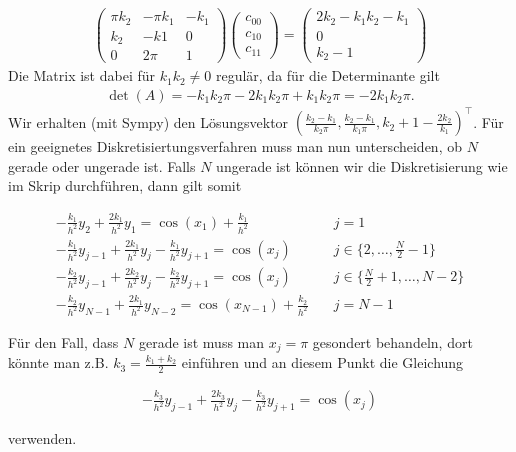 \begin{solution}
\begin{itemize}
    \begin{align*}
      \left( \begin{array}{ccc}
        \pi k_2 & -\pi k_1 & - k_1 \\
        k_2 & -k1 & 0 \\
        0 & 2\pi & 1
      \end{array}
      \right) \left(
      \begin{array}{c}
        c_{00} \\
        c_{10} \\
        c_{11}
      \end{array}
      \right)
      =
      \left(
      \begin{array}{c}
      2k_2 - k_1 k_2 - k_1 \\
      0 \\
      k_2 - 1
      \end{array}
      \right)
    \end{align*}
    Die Matrix ist dabei für $k_1k_2 \neq 0$ regulär, da für die Determinante gilt
    \begin{align*}
      \det(A) = -k_1k_2\pi -2k_1k_2\pi + k_1k_2\pi = -2k_1k_2\pi.
    \end{align*}
    Wir erhalten (mit Sympy) den Lösungsvektor
    $(\frac{k_2 - k_1}{k_2\pi}, \frac{k_2 - k_1}{k_1\pi}, k_2 + 1 - \frac{2k_2}{k_1})^{\top}$.
    Für ein geeignetes Diskretisiertungsverfahren muss man nun unterscheiden, ob
    $N$ gerade oder ungerade ist. Falls $N$ ungerade ist können wir die Diskretisierung
    wie im Skrip durchführen, dann gilt somit

    \begin{align*}
      -\frac{k_1}{h^2} y_2 + \frac{2k_1}{h^2} y_1
      =
      \cos(x_1) + \frac{k_1}{h^2}
      \quad
      & j = 1 \\
      -\frac{k_1}{h^2} y_{j-1} + \frac{2k_1}{h^2} y_j - \frac{k_1}{h^2}y_{j+1}
      =
      \cos(x_j)
      \quad
      &j \in \{2, \dots, \frac{N}{2}-1\} \\
      -\frac{k_2}{h^2} y_{j-1} + \frac{2k_2}{h^2} y_j - \frac{k_2}{h^2}y_{j+1}
      =
      \cos(x_j)
      \quad
      &j \in \{\frac{N}{2}+1, \dots , N-2\} \\
      -\frac{k_2}{h^2} y_{N-1} + \frac{2k_1}{h^2} y_{N-2}
      =
      \cos(x_{N-1})+ \frac{k_2}{h^2}
      \quad
      & j = N-1
    \end{align*}

    Für den Fall, dass $N$ gerade ist muss man $x_j = \pi$ gesondert behandeln, dort
    könnte man z.B. $k_3 = \frac{k_1 +k_2}{2}$ einführen und an diesem Punkt die Gleichung

    \begin{align*}
    -\frac{k_3}{h^2} y_{j-1} + \frac{2k_3}{h^2} y_j - \frac{k_3}{h^2}y_{j+1}
    =
    \cos(x_j)
    \end{align*}

    verwenden.
  \end{itemize}
\end{solution}

